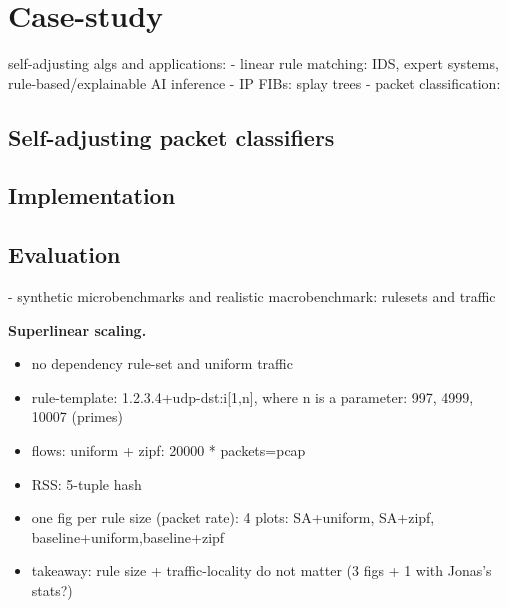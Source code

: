 \section{Case-study }\label{sec:case-study}


self-adjusting algs and applications:
- linear rule matching: IDS, expert systems, rule-based/explainable AI inference
- IP FIBs: splay trees
- packet classification:




\subsection{Self-adjusting packet classifiers}
\label{sec:sa-nf-tables}

\subsection{Implementation}
\label{sec:sa-nf-tables-impl}

\subsection{Evaluation}
\label{sec:sa-nf-tables-eval}

- synthetic microbenchmarks and realistic macrobenchmark: rulesets and traffic

\noindent%
\textbf{Superlinear scaling.} %
\begin{itemize}
\item no dependency rule-set and uniform traffic
\item rule-template: 1.2.3.4+udp-dst:i[1,n], where n is a parameter: 997, 4999, 10007 (primes)
\item flows: uniform + zipf: 20000 * packets=pcap
\item RSS: 5-tuple hash
\item one fig per rule size (packet rate): 4 plots: SA+uniform, SA+zipf, baseline+uniform,baseline+zipf
\item takeaway: rule size + traffic-locality do not matter (3 figs + 1 with Jonas's stats?)
\end{itemize}

